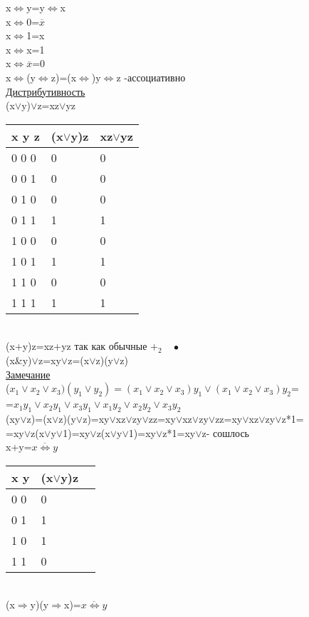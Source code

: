 \documentclass{article}
\begin{document}
x$\Leftrightarrow$y=y$\Leftrightarrow$x\\
x$\Leftrightarrow$0=$\overline{x}$\\
x$\Leftrightarrow$1=x\\
x$\Leftrightarrow$x=1\\
x$\Leftrightarrow \overline{x}$=0\\
x$\Leftrightarrow$(y$\Leftrightarrow$z)=(x$\Leftrightarrow$)y$\Leftrightarrow$z -ассоциативно\\
\underline{Дистрибутивность}\\
(x$\vee$y)$\vee$z=xz$\vee$yz\\
\begin{tabular}{l|l|l}
x y z&(x$\vee$y)z&xz$\vee$yz\\
\hline
0 0 0& 0& 0\\
0 0 1& 0& 0\\
0 1 0& 0& 0\\
0 1 1& 1& 1\\
1 0 0& 0& 0\\
1 0 1& 1& 1\\
1 1 0& 0& 0\\
1 1 1& 1& 1\\
\end{tabular}\\
(x+y)z=xz+yz так как обычные $+_2 \quad \bullet$\\
(x\&y)$\vee$z=xy$\vee$z=(x$\vee$z)(y$\vee$z)\\
\underline{Замечание}\\
($x_1\vee x_2\vee x_3)(y_1\vee y_2)=(x_1\vee x_2 \vee x_3)y_1\vee(x_1\vee x_2\vee x_3)y_2$=\\
=$x_1y_1\vee x_2y_1\vee x_3y_1 \vee x_1y_2\vee x_2y_2\vee x_3y_2$\\
(xy$\vee$z)=(x$\vee$z)(y$\vee$z)=xy$\vee$xz$\vee$zy$\vee$zz=xy$\vee$xz$\vee$zy$\vee$zz=xy$\vee$xz$\vee$zy$\vee$z*1=\\
=xy$\vee$z(x$\vee$y$\vee$1)=xy$\vee$z(x$\vee$y$\vee$1)=xy$\vee$z*1=xy$\vee$z- сошлось\\
x+y=$\overline{x\Leftrightarrow y}$\\
\begin{tabular}{l|l|l}
x y&(x$\vee$y)z\\
\hline
0 0& 0\\
0 1& 1\\
1 0& 1\\
1 1& 0\\
\end{tabular}\\
(x$\Rightarrow$y)(y$\Rightarrow $x)=$\overline{x\Leftrightarrow y}$
\end{document}

